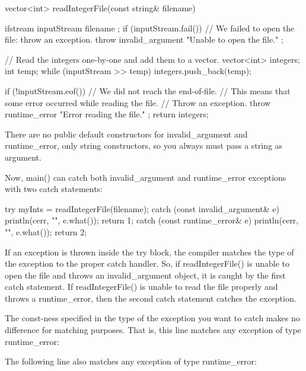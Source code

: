 \begin{cpp}
vector<int> readIntegerFile(const string& filename)
{
    ifstream inputStream { filename };
    if (inputStream.fail()) {
        // We failed to open the file: throw an exception.
        throw invalid_argument { "Unable to open the file." };
    }

    // Read the integers one-by-one and add them to a vector.
    vector<int> integers;
    int temp;
    while (inputStream >> temp) {
        integers.push_back(temp);
    }

    if (!inputStream.eof()) {
        // We did not reach the end-of-file.
        // This means that some error occurred while reading the file.
        // Throw an exception.
        throw runtime_error { "Error reading the file." };
    }
    return integers;
}
\end{cpp}

There are no public default constructors for invalid\_argument and runtime\_error, only string constructors, so you always must pass a string as argument.

Now, main() can catch both invalid\_argument and runtime\_error exceptions with two catch statements:

\begin{cpp}
try {
    myInts = readIntegerFile(filename);
} catch (const invalid_argument& e) {
    println(cerr, "{}", e.what());
    return 1;
} catch (const runtime_error& e) {
    println(cerr, "{}", e.what());
    return 2;
}
\end{cpp}

If an exception is thrown inside the try block, the compiler matches the type of the exception to the proper catch handler. So, if readIntegerFile() is unable to open the file and throws an invalid\_argument object, it is caught by the first catch statement. If readIntegerFile() is unable to read the file properly and throws a runtime\_error, then the second catch statement catches the exception.


The const-ness specified in the type of the exception you want to catch makes no difference for matching purposes. That is, this line matches any exception of type runtime\_error:

\begin{cpp}
} catch (const runtime_error& e) {
\end{cpp}

The following line also matches any exception of type runtime\_error:

